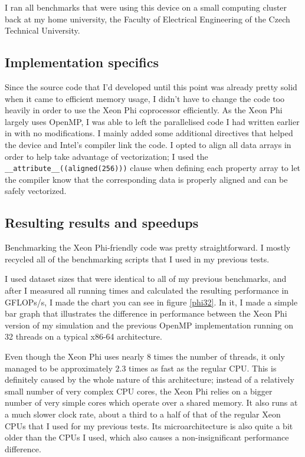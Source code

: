\documentclass[journal]{IEEEtran}
\begin{document}
		I ran all benchmarks that were using this device on a small computing cluster back at my home university, the Faculty of Electrical Engineering of the Czech Technical University.
		
		\subsection*{Implementation specifics}
		
			Since the source code that I'd developed until this point was already pretty solid when it came to efficient memory usage, I didn't have to change the code too heavily in order to use the Xeon Phi coprocessor efficiently. As the Xeon Phi largely uses OpenMP, I was able to left the parallelised code I had written earlier in with no modifications. I mainly added some additional directives that helped the device and Intel's compiler link the code. I opted to align all data arrays in order to help take advantage of vectorization; I used the \texttt{\_\_attribute\_\_((aligned(256)))} clause when defining each property array to let the compiler know that the corresponding data is properly aligned and can be safely vectorized.
			
		\subsection*{Resulting results and speedups}
		
			Benchmarking the Xeon Phi-friendly code was pretty straightforward. I mostly recycled all of the benchmarking scripts that I used in my previous tests. 
			
			I used dataset sizes that were identical to all of my previous benchmarks, and after I measured all running times and calculated the resulting performance in GFLOPs/s, I made the chart you can see in figure \ref{phi32}. In it, I made a simple bar graph that illustrates the difference in performance between the Xeon Phi version of my simulation and the previous OpenMP implementation running on 32 threads on a typical x86-64 architecture.
			
			Even though the Xeon Phi uses nearly 8 times the number of threads, it only managed to be approximately $2.3$ times as fast as the regular CPU. This is definitely caused by the whole nature of this architecture; instead of a relatively small number of very complex CPU cores, the Xeon Phi relies on a bigger number of very simple cores which operate over a shared memory. It also runs at a much slower clock rate, about a third to a half of that of the regular Xeon CPUs that I used for my previous tests. Its microarchitecture is also quite a bit older than the CPUs I used, which also causes a non-insignificant performance difference.
			
\end{document}
